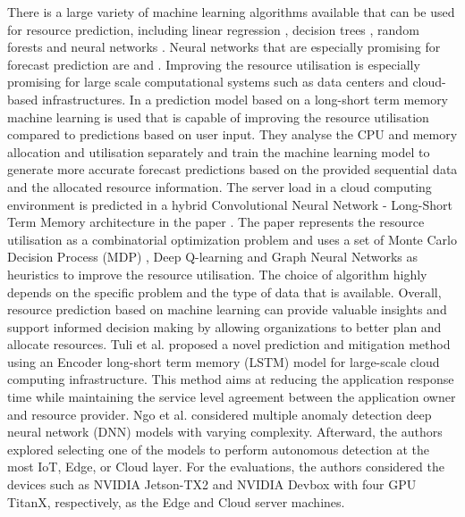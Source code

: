         There is a large variety of machine learning algorithms available that can be used for resource prediction, including linear regression \cite{weisbergAppliedLinearRegression2005}, decision trees \cite{kotsiantisDecisionTreesRecent2013}, random forests \cite{breimanRandomForests2001} and neural networks \cite{andersonIntroductionNeuralNetworks1995}.
        Neural networks that are especially promising for forecast prediction are  and .
        Improving the resource utilisation is especially promising for large scale computational systems such as data centers and cloud-based infrastructures. In \cite{thonglekImprovingResourceUtilization2019} a prediction model based on a long-short term memory machine learning is used that is capable of improving the resource utilisation compared to predictions based on user input.
        They analyse the CPU and memory allocation and utilisation separately and train the machine learning model to generate more accurate forecast predictions based on the provided sequential data and the allocated resource information.
        The server load in a cloud computing environment is predicted in a hybrid Convolutional Neural Network - Long-Short Term Memory architecture in the paper \cite{patelHybridCNNLSTMModel2022}.
        The paper \cite{orenSOLOSearchOnline2021} represents the resource utilisation as a combinatorial optimization problem and uses a set of Monte Carlo Decision Process (MDP) \cite{jamesMonteCarloTheory1980}, Deep Q-learning and Graph Neural Networks as heuristics to improve the resource utilisation.
        The choice of algorithm highly depends on the specific problem and the type of data that is available.
        Overall, resource prediction based on machine learning can provide valuable insights and support informed decision making by allowing organizations to better plan and allocate resources.
        Tuli et al. \cite{tuliStartStragglerPrediction2021} proposed a novel prediction and mitigation method using an Encoder long-short term memory (LSTM) model for large-scale cloud computing infrastructure. This method aims at reducing the application response time while maintaining the service level agreement between the application owner and resource provider.
        Ngo et al. \cite{ngoContextualbanditAnomalyDetection2020} considered multiple anomaly detection deep neural network (DNN) models with varying complexity. Afterward, the authors explored selecting one of the models to perform autonomous detection at the most IoT, Edge, or Cloud layer. For the evaluations, the authors considered the devices such as NVIDIA Jetson-TX2 and NVIDIA Devbox with four GPU TitanX, respectively, as the Edge and Cloud server machines.
